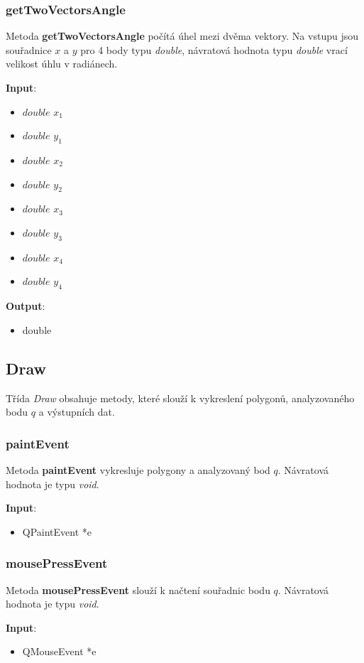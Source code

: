 \documentclass[a4paper, 12pt]{article}
\begin{document}
\subsubsection{getTwoVectorsAngle}
Metoda \textbf{getTwoVectorsAngle} počítá úhel mezi dvěma vektory. Na vstupu jsou souřadnice $x$ a $y$ pro 4 body typu \textit{double}, návratová hodnota typu \textit{double} vrací velikost úhlu v radiánech.

\textbf{Input}:
\begin{itemize}
\item $double$ $x_1$
\item $double$ $y_1$
\item $double$ $x_2$
\item $double$ $y_2$
\item $double$ $x_3$
\item $double$ $y_3$
\item $double$ $x_4$
\item $double$ $y_4$
\end{itemize}

\textbf{Output}:
\begin{itemize}
\item double 
\end{itemize}

\subsection{Draw}
Třída \textsl{Draw} obsahuje metody, které slouží k vykreslení polygonů, analyzovaného bodu $q$ a výstupních dat.

\subsubsection{paintEvent}
Metoda \textbf{paintEvent} vykresluje polygony a analyzovaný bod $q$. Návratová hodnota je typu \textsl{void}.

\textbf{Input}:
\begin{itemize}
\item QPaintEvent *e
\end{itemize}

\subsubsection{mousePressEvent}
Metoda \textbf{mousePressEvent} slouží k načtení souřadnic bodu $q$. Návratová hodnota je typu \textsl{void}.

\textbf{Input}:
\begin{itemize}
\item QMouseEvent *e
\end{itemize}
\end{document}

